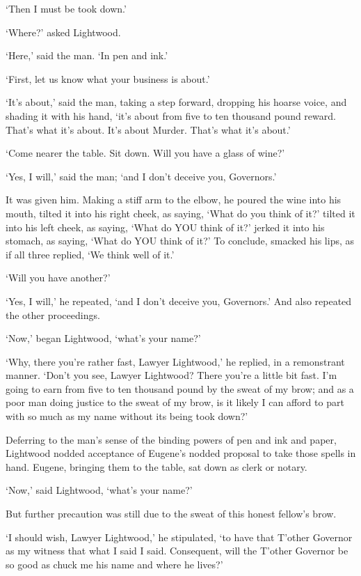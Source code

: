 ‘Then I must be took down.’

‘Where?’ asked Lightwood.

‘Here,’ said the man. ‘In pen and ink.’

‘First, let us know what your business is about.’

‘It’s about,’ said the man, taking a step forward, dropping his hoarse
voice, and shading it with his hand, ‘it’s about from five to ten
thousand pound reward. That’s what it’s about. It’s about Murder. That’s
what it’s about.’

‘Come nearer the table. Sit down. Will you have a glass of wine?’

‘Yes, I will,’ said the man; ‘and I don’t deceive you, Governors.’

It was given him. Making a stiff arm to the elbow, he poured the wine
into his mouth, tilted it into his right cheek, as saying, ‘What do you
think of it?’ tilted it into his left cheek, as saying, ‘What do YOU
think of it?’ jerked it into his stomach, as saying, ‘What do YOU think
of it?’ To conclude, smacked his lips, as if all three replied, ‘We
think well of it.’

‘Will you have another?’

‘Yes, I will,’ he repeated, ‘and I don’t deceive you, Governors.’ And
also repeated the other proceedings.

‘Now,’ began Lightwood, ‘what’s your name?’

‘Why, there you’re rather fast, Lawyer Lightwood,’ he replied, in a
remonstrant manner. ‘Don’t you see, Lawyer Lightwood? There you’re a
little bit fast. I’m going to earn from five to ten thousand pound by
the sweat of my brow; and as a poor man doing justice to the sweat of my
brow, is it likely I can afford to part with so much as my name without
its being took down?’

Deferring to the man’s sense of the binding powers of pen and ink and
paper, Lightwood nodded acceptance of Eugene’s nodded proposal to take
those spells in hand. Eugene, bringing them to the table, sat down as
clerk or notary.

‘Now,’ said Lightwood, ‘what’s your name?’

But further precaution was still due to the sweat of this honest
fellow’s brow.

‘I should wish, Lawyer Lightwood,’ he stipulated, ‘to have that T’other
Governor as my witness that what I said I said. Consequent, will the
T’other Governor be so good as chuck me his name and where he lives?’

